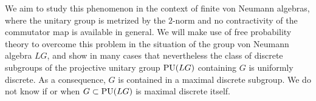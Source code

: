 We aim to study this phenomenon in the context of finite von Neumann algebras, where the unitary group is metrized by the $2$-norm and no contractivity of the commutator map is available in general. We will make use of free probability theory to overcome this problem in the situation of the group von Neumann algebra $LG$, and show in many cases that nevertheless the class of discrete subgroups of the projective unitary group ${\rm PU}(LG)$ containing $G$ is uniformly discrete. As a consequence, $G$ is contained in a maximal discrete subgroup. We do not know if or when $G \subset {\rm PU}(LG)$ is maximal discrete itself.
